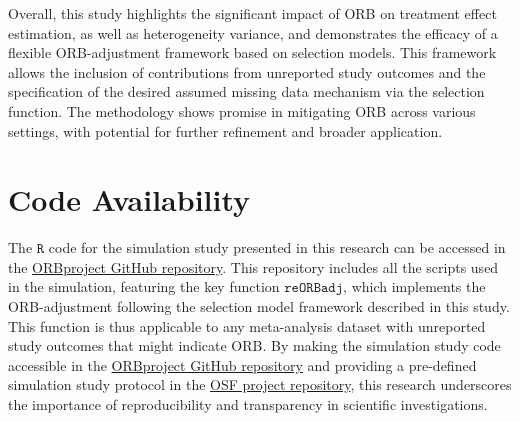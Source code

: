 \documentclass[twocolumn]{article}\usepackage[]{graphicx}\usepackage[]{xcolor}
\begin{document}
Overall, this study highlights the significant impact of ORB on treatment effect estimation, as well as heterogeneity variance, and demonstrates the efficacy of a flexible ORB-adjustment framework based on selection models. This framework allows the inclusion of contributions from unreported study outcomes and the specification of the desired assumed missing data mechanism via the selection function. The methodology shows promise in mitigating ORB across various settings, with potential for further refinement and broader application.

\section{Code Availability}

The $\texttt{R}$ code for the simulation study presented in this research can be accessed in the \href{https://github.com/agaiasaracini/ORBproject}{ORBproject GitHub repository}. This repository includes all the scripts used in the simulation, featuring the key function $\texttt{reORBadj}$, which implements the ORB-adjustment following the selection model framework described in this study. This function is thus applicable to any meta-analysis dataset with unreported study outcomes that might indicate ORB. By making the simulation study code accessible in the \href{https://github.com/agaiasaracini/ORBproject}{ORBproject GitHub repository} and providing a pre-defined simulation study protocol in the \href{https://osf.io/ancdu/}{OSF project repository}, this research underscores the importance of reproducibility and transparency in scientific investigations.



\newpage

\end{document}
